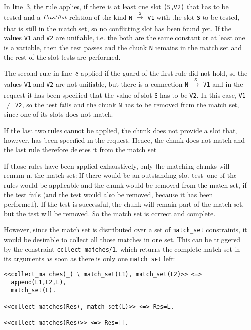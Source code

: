 In line~3, the rule applies, if there is at least one slot \lstinline|(S,V2)| that has to be tested and a $HasSlot$ relation of the kind \lstinline|N| $\xrightarrow[]{\mathtt{S}}$ \lstinline|V1| with the slot \lstinline|S| to be tested, that is still in the match set, so no conflicting slot has been found yet. If the values \lstinline|V1| and \lstinline|V2| are unifiable, i.e. the both are the same constant or at least one is a variable, then the test passes and the chunk \lstinline|N| remains in the match set and the rest of the slot tests are performed.

The second rule in line~8 applied if the guard of the first rule did not hold, so the values \lstinline|V1| and \lstinline|V2| are not unifiable, but there is a connection \lstinline|N| $\xrightarrow[]{\mathtt{S}}$ \lstinline|V1| and in the request it has been specified that the value of slot \lstinline|S| has to be \lstinline|V2|. In this case, \lstinline|V1| $\neq$ \lstinline|V2|, so the test fails and the chunk \lstinline|N| has to be removed from the match set, since one of its slots does not match.

If the last two rules cannot be applied, the chunk does not provide a slot that, however, has been specified in the request. Hence, the chunk does not match and the last rule therefore deletes it from the match set. 

If those rules have been applied exhaustively, only the matching chunks will remain in the match set: If there would be an outstanding slot test, one of the rules would be applicable and the chunk would be removed from the match set, if the test fails (and the test would also be removed, because it has been performed). If the test is successful, the chunk will remain part of the match set, but the test will be removed. So the match set is correct and complete.

However, since the match set is distributed over a set of \lstinline|match_set| constraints, it would be desirable to collect all those matches in one set. This can be triggered by the constraint \lstinline|collect_matches/1|, which returns the complete match set in its arguments as soon as there is only one \lstinline|match_set| left:

\begin{lstlisting}
<<collect_matches(_) \ match_set(L1), match_set(L2)>> <=> 
  append(L1,L2,L), 
  match_set(L).
  
<<collect_matches(Res), match_set(L)>> <=> Res=L.

<<collect_matches(Res)>> <=> Res=[].
\end{lstlisting}

